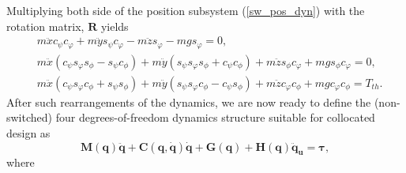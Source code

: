 Multiplying both side of the position subsystem (\ref{sw_pos_dyn}) with the rotation matrix, $\mathbf{R}$ yields
\begin{subequations}\label{pos_dyn_mod}
	\begin{align}
	&	m\ddot{x}c_{\psi}c_{\varphi} + m\ddot{y}s_{\psi}c_{\varphi} - m\ddot{z}s_{\varphi} - mgs_{\varphi} = 0, \\
	&	m\ddot{x}(c_{\psi}s_{\varphi}s_{\phi} - s_{\psi}c_{\phi}) + m\ddot{y}(s_{\psi}s_{\varphi}s_{\phi} + c_{\psi}c_{\phi}) + m\ddot{z}s_{\phi}c_{\varphi} + mgs_{\phi}c_{\varphi} = 0 , \\
	&	m\ddot{x}(c_{\psi}s_{\varphi}c_{\phi} + s_{\psi}s_{\phi}) + m\ddot{y}(s_{\psi}s_{\varphi}c_{\phi} - c_{\psi}s_{\phi}) + m\ddot{z}c_{\varphi}c_{\phi} + mgc_{\varphi}c_{\phi} = T_{th}.
	\end{align}
\end{subequations}
After such rearrangements of the dynamics, we are now ready to define the (non-switched) four degrees-of-freedom dynamics structure suitable for collocated design as
\begin{equation}\label{sys_non_sw}
\mathbf M( \mathbf q)\ddot{ \mathbf q}+\mathbf C(\mathbf q,\dot{\mathbf q})\dot{\mathbf q}+\mathbf G(\mathbf q)+\mathbf{H}( \mathbf q)\ddot{ \mathbf{q}}_{\mathbf u}=\boldsymbol \tau,
\end{equation} 
where
